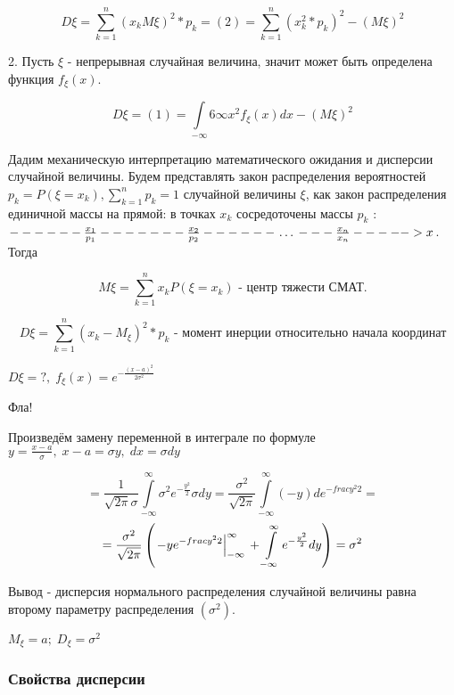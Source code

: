 \documentclass[a4paper,twoside,12pt]{report}
\begin{document}
	$$
	  D\xi = \sum^n_{k=1}(x_k M\xi)^2*p_k = (2)
	       = \sum^n_{k=1}(x^2_k*p_k)^2 - (M\xi)^2
	$$

	2. Пусть $\xi$ - непрерывная случайная величина, значит может быть определена функция $f_\xi(x)$. 
	
	$$
	  D\xi = (1) = \int\limits_{-\infty}6\infty x^2 f_\xi(x) dx - (M\xi)^2
	$$

	Дадим механическую интерпретацию математического ожидания и дисперсии случайной величины. Будем представлять закон распределения вероятностей $p_k = P(\xi = x_k), \sum^n_{k=1}p_k = 1$ случайной величины $\xi$, как закон распределения единичной массы на прямой: в точках $x_k$ сосредоточены массы $p_k$ : $------\frac{x_1}{p_1}-------\frac{x_2}{p_2}------ \,\ldots\, ---\frac{x_n}{x_n}----->x$. Тогда 
	
	$$
	  M\xi = \sum^n_{k=1} x_k P(\xi=x_k) \mbox{ - центр тяжести СМАТ}.
	$$ 

	$$
	  D\xi = \sum^n_{k=1} (x_k - M_\xi)^2 * p_k \mbox{ - момент инерции относительно начала координат}
	$$

 	 $D\xi = ?, \; f_\xi(x) = e^{-\frac{(x-a)^2}{2\sigma^2}}$

 	 Фла!
 
 	Произведём замену переменной в интеграле по формуле $y = \frac{x-a}{\sigma}, \; x - a = \sigma y, \; dx = \sigma dy$
 
 	$$
 	   = \frac{1}{\sqrt{2\pi}\sigma} \int\limits_{-\infty}^\infty \sigma^2 e^{-\frac{y^2}{2}} \sigma dy 
 	   = \frac{\sigma^2}{\sqrt{2\pi}}  \int\limits _{-\infty}^\infty (-y ) de^{-frac{y^2}{2}} 
	   = 	   
 	$$ $$
 	   = \frac{\sigma^2}{\sqrt{2\pi}} \left( \left. -ye^{-frac{y^2}{2}} \right|^\infty_{-\infty} \strut 
 	     + \int\limits_{-\infty}^\infty e^{-\frac{y^2}{2}} dy \right)
 	   = \sigma^2
 	 $$
 
	 Вывод - дисперсия нормального распределения случайной величины равна второму параметру распределения $(\sigma^2)$. 
 
	$M_\xi = a; \; D_\xi = \sigma^2$

	


	
	\subsubsection{Свойства дисперсии}
\end{document}
